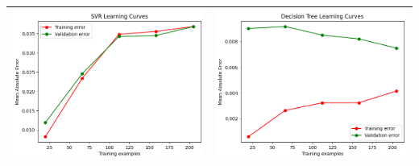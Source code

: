 \begin{table}[H]
    \centering
    \footnotesize
    \setlength\tabcolsep{0pt}
    \begin{tabularx}{\textwidth}{|X|X|}
        \hline
        \includegraphics[width=\linewidth, trim=0 0 0 0]{images/SVR_lc90_ridotto.png} &
        \includegraphics[width=\linewidth, trim=0 0 0 0]{images/DecisionTree_lc90_ridotto.png} \\
        \hline

\end{tabularx}
\end{table}
